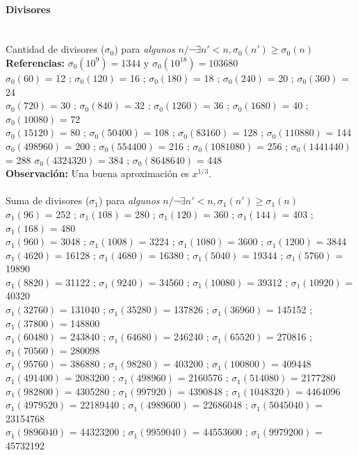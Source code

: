 \paragraph{Divisores} \ \\
Cantidad de divisores ($\sigma_0$) para \emph{algunos} $n / \neg\exists n'<n, \sigma_0(n') \geqslant \sigma_0(n)$ \\
\textbf{Referencias:} $\sigma_0(10^9) = 1344$ y $\sigma_0(10^{18}) = 103680$ \\
$\sigma_0(60)$ = 12 ; $\sigma_0(120)$ = 16 ; $\sigma_0(180)$ = 18 ; $\sigma_0(240)$ = 20 ; $\sigma_0(360)$ = 24 \\
$\sigma_0(720)$ = 30 ; $\sigma_0(840)$ = 32 ; $\sigma_0(1260)$ = 36 ; $\sigma_0(1680)$ = 40 ; $\sigma_0(10080)$ = 72 \\ $\sigma_0(15120)$ = 80 ; $\sigma_0(50400)$ = 108 ; $\sigma_0(83160)$ = 128 ; $\sigma_0(110880)$ = 144 \\
$\sigma_0(498960)$ = 200 ; $\sigma_0(554400)$ = 216 ; $\sigma_0(1081080)$ = 256 ; $\sigma_0(1441440)$ = 288  $\sigma_0(4324320)$ = 384 ; $\sigma_0(8648640)$ = 448 \\
\textbf{Observación:} Una buena aproximación es $x^{1/3}$. \\ \\
%
Suma de divisores ($\sigma_1$) para \emph{algunos} $n / \neg\exists n'<n, \sigma_1(n') \geqslant \sigma_1(n)$ \\
$\sigma_1(96)$ = 252 ; $\sigma_1(108)$ = 280 ; $\sigma_1(120)$ = 360 ; $\sigma_1(144)$ = 403 ; $\sigma_1(168)$ = 480 \\
$\sigma_1(960)$ = 3048 ; $\sigma_1(1008)$ = 3224 ; $\sigma_1(1080)$ = 3600 ; $\sigma_1(1200)$ = 3844 \\
$\sigma_1(4620)$ = 16128 ; $\sigma_1(4680)$ = 16380 ; $\sigma_1(5040)$ = 19344 ; $\sigma_1(5760)$ = 19890 \\
$\sigma_1(8820)$ = 31122 ; $\sigma_1(9240)$ = 34560 ; $\sigma_1(10080)$ = 39312 ; $\sigma_1(10920)$ = 40320 \\
$\sigma_1(32760)$ = 131040 ; $\sigma_1(35280)$ = 137826 ; $\sigma_1(36960)$ = 145152 ; $\sigma_1(37800)$ = 148800 \\
$\sigma_1(60480)$ = 243840 ; $\sigma_1(64680)$ = 246240 ; $\sigma_1(65520)$ = 270816 ; $\sigma_1(70560)$ = 280098 \\
$\sigma_1(95760)$ = 386880 ; $\sigma_1(98280)$ = 403200 ; $\sigma_1(100800)$ = 409448  \\
$\sigma_1(491400)$ = 2083200 ; $\sigma_1(498960)$ = 2160576 ; $\sigma_1(514080)$ = 2177280 \\
$\sigma_1(982800)$ = 4305280 ; $\sigma_1(997920)$ = 4390848 ; $\sigma_1(1048320)$ = 4464096 \\
$\sigma_1(4979520)$ = 22189440 ; $\sigma_1(4989600)$ = 22686048 ; $\sigma_1(5045040)$ = 23154768 \\
$\sigma_1(9896040)$ = 44323200 ; $\sigma_1(9959040)$ = 44553600 ; $\sigma_1(9979200)$ = 45732192
%
%



